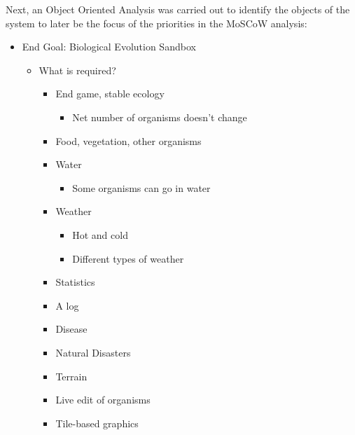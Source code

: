 \documentclass[a4paper, oneside, 11pt]{report}
\begin{document}
Next, an Object Oriented Analysis was carried out to identify the objects of the system to later be the focus of the priorities in the MoSCoW analysis:
\smallskip 
\begin{itemize}
	\item End Goal: Biological Evolution Sandbox
	\begin{itemize}
		\item What is required?
		\begin{itemize}
			\item End game, stable ecology
			\begin{itemize}
				\item Net number of organisms doesn't change
			\end{itemize}
			\item Food, vegetation, other organisms
			\item Water
			\begin{itemize}
				\item Some organisms can go in water
			\end{itemize}
			\item Weather
			\begin{itemize}
				\item Hot and cold
				\item Different types of weather
			\end{itemize}
			\item Statistics
			\item A log
			\item Disease
			\item Natural Disasters
			\item Terrain
			\item Live edit of organisms
			\item Tile-based graphics
		\end{itemize}
	\end{itemize}
\end{itemize}
\smallskip 
\end{document}
